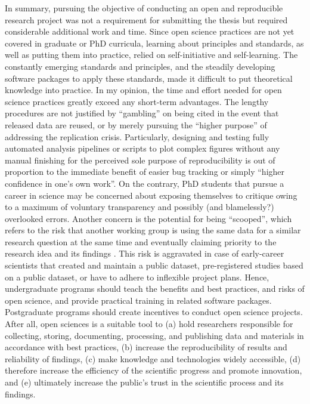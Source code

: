 %
In summary, pursuing the objective of conducting an open and reproducible
research project was not a requirement for submitting the thesis but required
considerable additional work and time.
%
Since open science practices are not yet covered in graduate or PhD curricula,
learning about principles and standards, as well as putting them into practice,
relied on self-initiative and self-learning.
%
The constantly emerging standards and principles, and the steadily developing
software packages to apply these standards, made it difficult to put theoretical
knowledge into practice.
%
In my opinion, the time and effort needed for open science practices greatly
exceed any short-term advantages.
%
The lengthy procedures are not justified by ``gambling'' on being cited in the
event that released data are reused, or by merely pursuing the ``higher
purpose'' of addressing the replication crisis.
%
Particularly, designing and testing fully automated analysis pipelines or
scripts to plot complex figures without any manual finishing for the perceived
sole purpose of reproducibility is out of proportion to the immediate benefit of
easier bug tracking or simply ``higher confidence in one's own work''.
%
On the contrary, PhD students that pursue a career in science may be concerned
about exposing themselves to critique owing to a maximum of voluntary
transparency and possibly (and blamelessly?) overlooked errors.
%
Another concern is the potential for being ``scooped'', which refers to the risk
that another working group is using the same data for a similar research
question at the same time and eventually claiming priority to the research idea
and its findings \citep[cf.][]{laine2017afraid}.
%
This risk is aggravated in case of early-career scientists that created and
maintain a public dataset, pre-registered studies based on a public dataset, or
have to adhere to inflexible project plans.
%
Hence, undergraduate programs should teach the benefits and best practices, and
risks of open science, and provide practical training in related software
packages.
%
Postgraduate programs should create incentives to conduct open science projects.
%
After all, open sciences is a suitable tool to
%
(a) hold researchers responsible for collecting, storing, documenting,
processing, and publishing data and materials in accordance with best practices,
%
(b) increase the reproducibility of results and reliability of findings,
%
(c) make knowledge and technologies widely accessible,
%
(d) therefore increase the efficiency of the scientific progress and promote
innovation, and
%
(e) ultimately increase the public's trust in the scientific process and its
findings.


